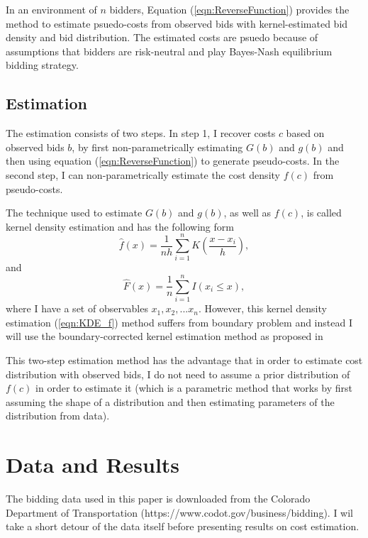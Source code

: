 \documentclass[11pt]{article}
\begin{document}
In an environment of $n$ bidders, Equation (\ref{eqn:ReverseFunction}) provides 
the method to estimate psuedo-costs from observed bids with kernel-estimated 
bid density and bid distribution. The estimated costs are psuedo because of  
assumptions that bidders are risk-neutral and play Bayes-Nash equilibrium bidding 
strategy. 

\subsection{Estimation}
The estimation consists of two steps. In step 1, I recover costs $c$ based on 
observed bids $b$, by first non-parametrically estimating $G(b)$ and $g(b)$ 
and then using equation (\ref{eqn:ReverseFunction}) to 
generate pseudo-costs. In the second step, I can non-parametrically estimate the cost
density $f(c)$ from pseudo-costs. 

The technique used to estimate $G(b)$ and $g(b)$, as well as $f(c)$, is called 
kernel density estimation and has the following form
\begin{equation}
    \hat{f}(x) = \frac{1}{nh}\sum_{i=1}^n K(\frac{x-x_i}{h}),
    \label{eqn:KDE_f}
\end{equation}
and 
\begin{equation}
    \hat{F}(x) = \frac{1}{n}\sum_{i=1}^n I(x_i \leq x), 
    \label{eqn:KDE_F}
\end{equation}
where I have a set of observables ${x_1, x_2, ... x_n}$. However, this  
kernel density estimation (\ref{eqn:KDE_f}) 
method suffers from boundary 
problem and instead I will use the boundary-corrected kernel estimation 
method as proposed in \cite{HickmanHubbard2015}

This two-step estimation method has the advantage that in order to estimate cost 
distribution with observed bids, I do not need to assume a prior distribution 
of $f(c)$ in order to estimate it (which is a parametric method that works by 
first assuming the shape of a distribution and then estimating parameters of the 
distribution from data). 


\section{Data and Results}
The bidding data used in this paper is downloaded from the Colorado Department of 
Transportation (https://www.codot.gov/business/bidding). I wil take a short detour of the data itself before 
presenting results on cost estimation. 
\end{document}
